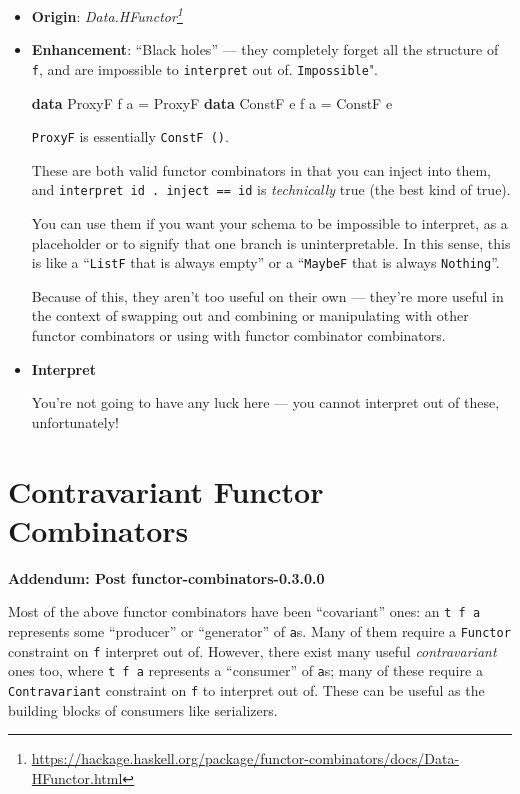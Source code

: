 \documentclass[]{article}
\newenvironment{Shaded}{}{}
\newcommand{\DataTypeTok}[1]{\textcolor[rgb]{0.56,0.13,0.00}{#1}}
\newcommand{\KeywordTok}[1]{\textcolor[rgb]{0.00,0.44,0.13}{\textbf{#1}}}
\newcommand{\NormalTok}[1]{#1}
\newcommand{\OtherTok}[1]{\textcolor[rgb]{0.00,0.44,0.13}{#1}}
\renewcommand{\href}[2]{#2\footnote{\url{#1}}}
\begin{document}
\begin{itemize}
\item
  \textbf{Origin}:
  \emph{\href{https://hackage.haskell.org/package/functor-combinators/docs/Data-HFunctor.html}{Data.HFunctor}}
\item
  \textbf{Enhancement}: ``Black holes'' --- they completely forget all the
  structure of \texttt{f}, and are impossible to \texttt{interpret} out of.
  \texttt{Impossible}".

\begin{Shaded}
\begin{Highlighting}[]
\KeywordTok{data} \DataTypeTok{ProxyF}\NormalTok{ f a }\OtherTok{=} \DataTypeTok{ProxyF}
\KeywordTok{data} \DataTypeTok{ConstF}\NormalTok{ e f a }\OtherTok{=} \DataTypeTok{ConstF}\NormalTok{ e}
\end{Highlighting}
\end{Shaded}

  \texttt{ProxyF} is essentially \texttt{ConstF\ ()}.

  These are both valid functor combinators in that you can inject into them, and
  \texttt{interpret\ id\ .\ inject\ ==\ id} is \emph{technically} true (the best
  kind of true).

  You can use them if you want your schema to be impossible to interpret, as a
  placeholder or to signify that one branch is uninterpretable. In this sense,
  this is like a ``\texttt{ListF} that is always empty'' or a ``\texttt{MaybeF}
  that is always \texttt{Nothing}''.

  Because of this, they aren't too useful on their own --- they're more useful
  in the context of swapping out and combining or manipulating with other
  functor combinators or using with functor combinator combinators.
\item
  \textbf{Interpret}

  You're not going to have any luck here --- you cannot interpret out of these,
  unfortunately!
\end{itemize}

\hypertarget{contravariant-functor-combinators}{%
\section{Contravariant Functor
Combinators}\label{contravariant-functor-combinators}}

\textbf{Addendum: Post functor-combinators-0.3.0.0}

Most of the above functor combinators have been ``covariant'' ones: an
\texttt{t\ f\ a} represents some ``producer'' or ``generator'' of \texttt{a}s.
Many of them require a \texttt{Functor} constraint on \texttt{f} interpret out
of. However, there exist many useful \emph{contravariant} ones too, where
\texttt{t\ f\ a} represents a ``consumer'' of \texttt{a}s; many of these require
a \texttt{Contravariant} constraint on \texttt{f} to interpret out of. These can
be useful as the building blocks of consumers like serializers.
\end{document}
